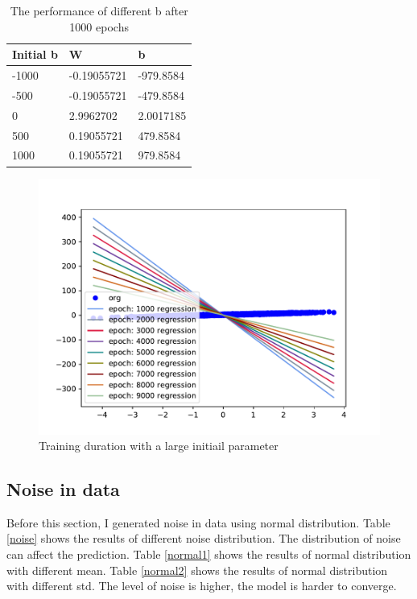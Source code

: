 \documentclass{article}
\begin{document}
\begin{table}[!h]
  \caption{The performance of different b after 1000 epochs}
  \label{tab:b}
  \centering
  \begin{tabular}{lll}
    \toprule
    Initial b     & W     & b  \\
    \midrule
    -1000 & -0.19055721  & -979.8584     \\
    -500     & -0.19055721 & -479.8584     \\
    0     & 2.9962702       & 2.0017185  \\
    500     & 0.19055721 & 479.8584      \\
    1000    & 0.19055721     & 979.8584  \\
    \bottomrule
  \end{tabular}
\end{table}


\begin{figure}[!h]
  \centering
  \includegraphics[scale=0.5]{imgs/epoch.pdf}
  \caption{Training duration with a large initiail parameter}
  \label{epoch}
\end{figure}

\subsection{Noise in data}
Before this section, I generated noise in data using normal distribution. Table \ref{noise} shows the results of different noise distribution. The distribution of noise can affect the prediction. Table \ref{normal1} shows the results of normal distribution with different mean. Table \ref{normal2} shows the results of normal distribution with different std. The level of noise is higher, the model is harder to converge.
\end{document}
